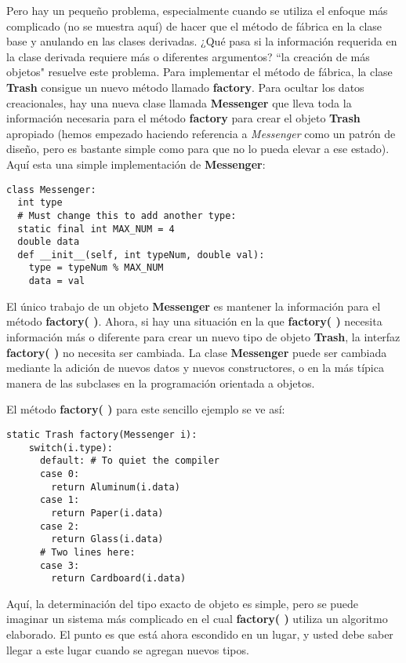 Pero hay un pequeño problema, especialmente cuando se utiliza el enfoque más complicado (no se muestra aquí) de hacer que el método de fábrica en la clase base y anulando en las clases derivadas. ¿Qué pasa si la información requerida en la clase derivada requiere más o diferentes argumentos? “la creación de más objetos" resuelve este problema. Para implementar el método de fábrica, la clase \textbf{Trash} consigue un nuevo método llamado \textbf{factory}. Para ocultar los datos creacionales, hay una nueva clase llamada \textbf{Messenger} que lleva toda la información necesaria para el método \textbf{factory} para crear el objeto \textbf{Trash} apropiado (hemos empezado haciendo referencia a \textit{Messenger} como un patrón de diseño, pero es bastante simple como para que no lo pueda elevar a ese estado). Aquí esta una simple implementación de \textbf{Messenger}:     \newline

\begin{lstlisting}
class Messenger: 
  int type 
  # Must change this to add another type: 
  static final int MAX_NUM = 4 
  double data 
  def __init__(self, int typeNum, double val): 
    type = typeNum % MAX_NUM 
    data = val 
\end{lstlisting}

El único trabajo de un objeto \textbf{Messenger} es mantener la información para el método \textbf{factory( )}. Ahora, si hay una situación en la que \textbf{factory( )} necesita información más o diferente para crear un nuevo tipo de objeto \textbf{Trash}, la interfaz \textbf{factory( )} no necesita ser cambiada. La clase \textbf{Messenger} puede ser cambiada mediante la adición de nuevos datos y nuevos constructores, o en la más típica manera de las subclases en la programación orientada a objetos.   \newline

El método \textbf{factory( )} para este sencillo ejemplo se ve así:     \newline

\begin{lstlisting}
static Trash factory(Messenger i): 
    switch(i.type): 
      default: # To quiet the compiler 
      case 0: 
        return Aluminum(i.data) 
      case 1: 
        return Paper(i.data) 
      case 2: 
        return Glass(i.data) 
      # Two lines here: 
      case 3:  
        return Cardboard(i.data)
\end{lstlisting}

Aquí, la determinación del tipo exacto de objeto es simple, pero se puede imaginar un sistema más complicado en el cual \textbf{factory( )} utiliza un algoritmo elaborado. El punto es que está ahora escondido en un lugar, y usted debe saber llegar a este lugar cuando se agregan nuevos tipos.  \newline

